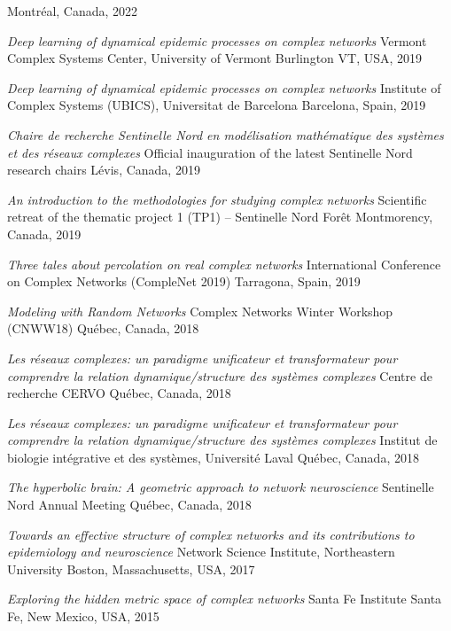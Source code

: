 \documentclass[11pt]{article}
\makeatletter
\newcommand{\reversearabic}[1]{\expandafter\@reversearabic\csname c@#1\endcsname}
\newcommand{\@reversearabic}[1]{%
  \number\numexpr\getrefnumber{this@etaremune@\romannumeral\c@etaremune}-#1+1\relax
}
\newcounter{etaremune}
\newenvironment{etaremune}[1][]{%
  \stepcounter{etaremune}%
  \begin{enumerate}[label=\reversearabic*.,#1]%
}{%
  \edef\@currentlabel{\the\csname c@\@enumctr\endcsname}%
  \label{this@etaremune@\romannumeral\c@etaremune}%
  \end{enumerate}%
}
\makeatother
\begin{document}
\begin{etaremune}[itemsep=0.5em, label={[I\reversearabic*]}]
{  Montréal, Canada, 2022}
%
  \item \parbox[t]{\textwidth-30pt}{\textit{Deep learning of dynamical epidemic processes on complex networks}\split
  Vermont Complex Systems Center, University of Vermont\split
  Burlington VT, USA, 2019}
%
  \item \parbox[t]{\textwidth-30pt}{\textit{Deep learning of dynamical epidemic processes on complex networks}\split
  Institute of Complex Systems (UBICS), Universitat de Barcelona\split
  Barcelona, Spain, 2019}
%
  \item \parbox[t]{\textwidth-30pt}{\textit{Chaire de recherche Sentinelle Nord en modélisation mathématique des systèmes et des réseaux complexes}\split
  Official inauguration of the latest Sentinelle Nord research chairs\split
  L\'evis, Canada, 2019}
%
  \item \parbox[t]{\textwidth-30pt}{\textit{An introduction to the methodologies for studying complex networks}\split
  Scientific retreat of the thematic project 1 (TP1) – Sentinelle Nord\split
  For\^et Montmorency, Canada, 2019}
%
  \item \parbox[t]{\textwidth-30pt}{\textit{Three tales about percolation on real complex networks}\split
  International Conference on Complex Networks (CompleNet 2019)\split
  Tarragona, Spain, 2019}
%
  \item \parbox[t]{\textwidth-30pt}{\textit{Modeling with Random Networks}\split
  Complex Networks Winter Workshop (CNWW18)\split
  Qu\'ebec, Canada, 2018}
%
  \item \parbox[t]{\textwidth-30pt}{\textit{Les réseaux complexes: un paradigme unificateur et transformateur pour comprendre la relation dynamique/structure des systèmes complexes}\split
  Centre de recherche CERVO\split
  Qu\'ebec, Canada, 2018}
%
  \item \parbox[t]{\textwidth-30pt}{\textit{Les réseaux complexes: un paradigme unificateur et transformateur pour comprendre la relation dynamique/structure des systèmes complexes}\split
  Institut de biologie intégrative et des systèmes, Université Laval\split
  Qu\'ebec, Canada, 2018}
%
  \item \parbox[t]{\textwidth-30pt}{\textit{The hyperbolic brain: A geometric approach to network neuroscience}\split
  Sentinelle Nord Annual Meeting\split
  Qu\'ebec, Canada, 2018}
%
  \item \parbox[t]{\textwidth-30pt}{\textit{Towards an effective structure of complex networks and its contributions to epidemiology and neuroscience}\split
  Network Science Institute, Northeastern University\split
  Boston, Massachusetts, USA, 2017}
%
  \item \parbox[t]{\textwidth-30pt}{\textit{Exploring the hidden metric space of complex networks}\split
  Santa Fe Institute\split
  Santa Fe, New Mexico, USA, 2015}
%
\end{etaremune}
\end{document}
